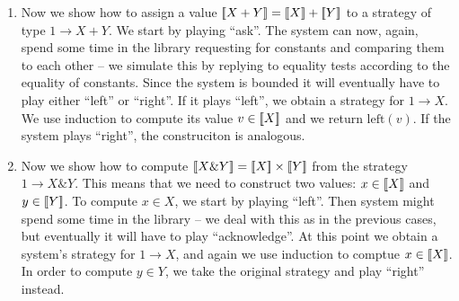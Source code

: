 \begin{enumerate}
    


    \item Now we show how to assign a value $[{\kern-0.4ex}[X + Y]{\kern-0.4ex}] = [{\kern-0.4ex}[X]{\kern-0.4ex}] + [{\kern-0.4ex}[Y]{\kern-0.4ex}]$ to a strategy of type $1 \to X+Y$. We start by playing 
    ``ask''. The system can now, again, spend some time in the library requesting for constants and comparing them to 
    each other -- we simulate this by replying to equality tests according to the equality of constants. 
    Since the system is bounded it will eventually have to play either ``left'' or ``right''.
    If it plays ``left'', we obtain a strategy for $1 \to X$. We use induction to
    compute its value $v \in [{\kern-0.4ex}[X]{\kern-0.4ex}]$ and we return $\text{left}(v)$. 
    If the system plays ``right'', the construciton is analogous. 

    \item Now we show how to compute $[{\kern-0.4ex}[X \& Y]{\kern-0.4ex}] = [{\kern-0.4ex}[X]{\kern-0.4ex}] \times [{\kern-0.4ex}[Y]{\kern-0.4ex}]$ from the strategy $1 \to X \& Y$.
          This means that we need to construct two values: $x \in [{\kern-0.4ex}[X]{\kern-0.4ex}]$ and $y \in [{\kern-0.4ex}[Y]{\kern-0.4ex}]$.
          To compute $x \in X$, we start by playing ``left''. Then system might spend some time in the library -- 
          we deal with this as in the previous cases, but eventually it will have to play ``acknowledge''. 
          At this point we obtain a system's strategy for $1 \to X$, and again we use induction to comptue $x \in [{\kern-0.4ex}[X]{\kern-0.4ex}]$.
          In order to compute $y \in Y$, we take the original strategy and play ``right'' instead. 



\end{enumerate}
